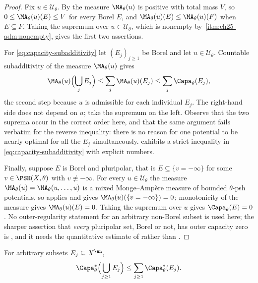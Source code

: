 \begin{proof}
Fix \(u\in\mathcal U_\theta\).  By  the
measure \(\MA_\theta(u)\) is positive with total mass \(V\), so
\(0\leq\MA_\theta(u)(E)\leq V\) for every Borel \(E\), and
\(\MA_\theta(u)(E)\leq\MA_\theta(u)(F)\) when \(E\subseteq F\).  Taking the
supremum over \(u\in\mathcal U_\theta\), which is nonempty by
\,\cref{itm:ch25-adm:nonempty}, gives the
first two assertions.

For \eqref{eq:capacity-subadditivity} let \((E_j)_{j\geq1}\) be Borel and let
\(u\in\mathcal U_\theta\).  Countable subadditivity of the measure
\(\MA_\theta(u)\) gives
\[
 \MA_\theta(u)\Bigl(\bigcup_jE_j\Bigr)
 \leq\sum_j\MA_\theta(u)(E_j)
 \leq\sum_j\Capa_\theta(E_j),
\]
the second step because \(u\) is admissible for each individual \(E_j\).  The
right-hand side does not depend on \(u\); take the supremum on the left.
Observe that the two suprema occur in the correct order here, and that the
same argument fails verbatim for the reverse inequality: there is no reason
for one potential to be nearly optimal for all the \(E_j\) simultaneously.
 exhibits a strict inequality in
\eqref{eq:capacity-subadditivity} with explicit numbers.

Finally, suppose \(E\) is Borel and pluripolar, that is
\(E\subseteq\{v=-\infty\}\) for some \(v\in\PSH(X,\theta)\) with
\(v\not\equiv-\infty\).  For every \(u\in\mathcal U_\theta\) the measure
\(\MA_\theta(u)=\MA_\theta(u,\ldots,u)\) is a mixed Monge--Amp\`ere measure
of bounded \(\theta\)-psh potentials, so
 applies and gives
\(\MA_\theta(u)(\{v=-\infty\})=0\); monotonicity of the measure gives
\(\MA_\theta(u)(E)=0\).  Taking the supremum over \(u\) gives
\(\Capa_\theta(E)=0\).  No outer-regularity statement for an arbitrary
non-Borel subset is used here; the sharper assertion that \emph{every}
pluripolar set, Borel or not, has outer capacity zero is
, and it needs the quantitative estimate of
 rather than
.
\end{proof}

\begin{corollary}
\label{cor:ch25-outer-subadditivity}
For arbitrary subsets \(E_j\subseteq X^{\An}\),
\[
 \Capa_\theta^*\Bigl(\bigcup_{j\geq1}E_j\Bigr)
 \leq\sum_{j\geq1}\Capa_\theta^*(E_j).
\]
\end{corollary}

